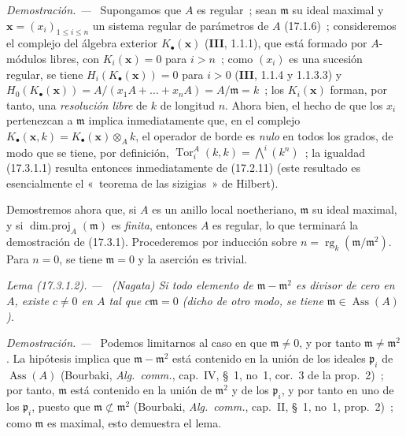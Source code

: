 \documentclass[10pt,oneside]{book}
\makeatletter
\newcommand{\setmanualcurrentlabel}[1]{\def\@currentlabel{#1}}
\newcommand{\oldpage}[2][]{%
  \setcounter{footnote}{0}%
  \marginpar{\scriptsize\textbf{#1}~|~#2}\ignorespaces}
\newenvironment{lemma}[1][]{%
  \setmanualcurrentlabel{#1}\par\medskip\noindent\itshape Lema (#1). ---\ }{\par}
\newenvironment{proof}{%
  \par\medskip\noindent\textit{Demostración. ---\ }}{\par}
\providecommand{\setmin}{-}%
\makeatother
\begin{document}
\begin{proof}
Supongamos que $A$ es regular~; sean $\mathfrak{m}$ su ideal maximal y
$\mathbf{x}=(x_i)_{1\leq i\leq n}$ un sistema regular de parámetros de $A$
(17.1.6)~; consideremos el complejo del álgebra exterior
$K_\bullet(\mathbf{x})$ (\textbf{III}, 1.1.1), que está formado por $A$-módulos
libres, con $K_i(\mathbf{x})=0$ para $i>n$~; como $(x_i)$ es una sucesión
regular, se tiene $H_i(K_\bullet(\mathbf{x}))=0$ para $i>0$ (\textbf{III},
1.1.4 y 1.1.3.3) y
$H_0(K_\bullet(\mathbf{x}))=A/(x_1A+\ldots+x_nA)=A/\mathfrak{m}=k$~; los
$K_i(\mathbf{x})$ forman, por tanto, una \emph{resolución libre} de $k$ de
longitud $n$. Ahora bien, el hecho de que los $x_i$ pertenezcan a $\mathfrak{m}$
implica inmediatamente que, en el complejo
$K_\bullet(\mathbf{x},k)=K_\bullet(\mathbf{x})\otimes_A k$, el operador de borde
es \emph{nulo} en todos los grados, de modo que se tiene, por definición,
$\operatorname{Tor}^A_i(k,k)=\bigwedge^i(k^n)$~; la igualdad (17.3.1.1) resulta
entonces inmediatamente de (17.2.11) (este resultado es esencialmente el «~teorema de las
sizigias~» de Hilbert).

Demostremos ahora que, si $A$ es un anillo local noetheriano,
$\mathfrak{m}$ su ideal maximal, y si
$\operatorname{dim.proj}_A(\mathfrak{m})$ es \emph{finita}, entonces $A$ es
regular, lo que terminará la demostración de (17.3.1). Procederemos por
inducción sobre $n=\operatorname{rg}_k(\mathfrak{m}/\mathfrak{m}^2)$. Para
$n=0$, se tiene $\mathfrak{m}=0$ y la aserción es trivial.
\end{proof}

\begin{lemma}[17.3.1.2]
\label{0.17.3.1.2-es}
\textnormal{(Nagata)} Si todo elemento de
$\mathfrak m\setmin\mathfrak{m}^2$ es divisor de cero en $A$, existe
$c\neq0$ en $A$ tal que $c\mathfrak{m}=0$ (dicho de otro modo, se tiene
$\mathfrak{m}\in\operatorname{Ass}(A)$).
\end{lemma}

\begin{proof}
Podemos limitarnos al caso en que $\mathfrak{m}\neq0$, y por tanto
$\mathfrak{m}\neq\mathfrak{m}^2$. La hipótesis implica que
$\mathfrak m\setmin\mathfrak{m}^2$ está contenido en la unión de los ideales
$\mathfrak{p}_i$ de $\operatorname{Ass}(A)$ (Bourbaki,
\emph{Alg.~comm.}, cap.~IV, \S~1, no~1, cor.~3 de la prop.~2)~; por tanto,
$\mathfrak{m}$ está contenido en la unión de $\mathfrak{m}^2$
\oldpage[0\textsubscript{IV-1}]{47}
y de los $\mathfrak{p}_i$, y por tanto en uno de los $\mathfrak{p}_i$, puesto que
$\mathfrak{m}\not\subset\mathfrak{m}^2$ (Bourbaki, \emph{Alg.~comm.},
cap.~II, \S~1, no~1, prop.~2)~; como $\mathfrak{m}$ es maximal, esto demuestra el
lema.
\end{proof}
\end{document}
